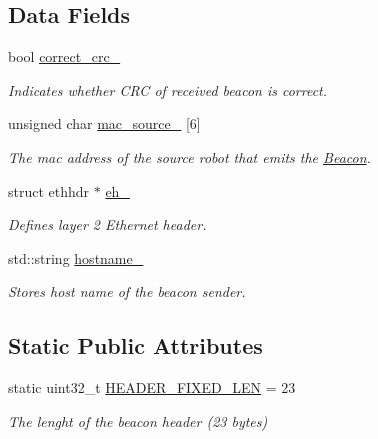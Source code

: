 \subsection*{Data Fields}
\begin{DoxyCompactItemize}
\item 
\hypertarget{classBeacon_abab167ece2947c117638cde893c425f8}{bool \hyperlink{classBeacon_abab167ece2947c117638cde893c425f8}{correct\-\_\-crc\-\_\-}}\label{classBeacon_abab167ece2947c117638cde893c425f8}

\begin{DoxyCompactList}\small\item\em Indicates whether C\-R\-C of received beacon is correct. \end{DoxyCompactList}\item 
\hypertarget{classBeacon_a72c5f38f3e5b28af976f6d7281969fe9}{unsigned char \hyperlink{classBeacon_a72c5f38f3e5b28af976f6d7281969fe9}{mac\-\_\-source\-\_\-} \mbox{[}6\mbox{]}}\label{classBeacon_a72c5f38f3e5b28af976f6d7281969fe9}

\begin{DoxyCompactList}\small\item\em The mac address of the source robot that emits the \hyperlink{classBeacon}{Beacon}. \end{DoxyCompactList}\item 
\hypertarget{classBeacon_a4655e5fdc179bb569c8b3bf33feca048}{struct ethhdr $\ast$ \hyperlink{classBeacon_a4655e5fdc179bb569c8b3bf33feca048}{eh\-\_\-}}\label{classBeacon_a4655e5fdc179bb569c8b3bf33feca048}

\begin{DoxyCompactList}\small\item\em Defines layer 2 Ethernet header. \end{DoxyCompactList}\item 
\hypertarget{classBeacon_a8cac0cdb11df430d406e1ab55e1dde58}{std\-::string \hyperlink{classBeacon_a8cac0cdb11df430d406e1ab55e1dde58}{hostname\-\_\-}}\label{classBeacon_a8cac0cdb11df430d406e1ab55e1dde58}

\begin{DoxyCompactList}\small\item\em Stores host name of the beacon sender. \end{DoxyCompactList}\end{DoxyCompactItemize}
\subsection*{Static Public Attributes}
\begin{DoxyCompactItemize}
\item 
\hypertarget{classBeacon_ad65dea59cbc7803632b693e41709f409}{static uint32\-\_\-t \hyperlink{classBeacon_ad65dea59cbc7803632b693e41709f409}{H\-E\-A\-D\-E\-R\-\_\-\-F\-I\-X\-E\-D\-\_\-\-L\-E\-N} = 23}\label{classBeacon_ad65dea59cbc7803632b693e41709f409}

\begin{DoxyCompactList}\small\item\em The lenght of the beacon header (23 bytes) \end{DoxyCompactList}\end{DoxyCompactItemize}


